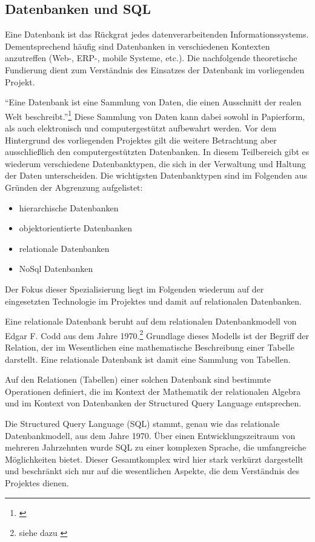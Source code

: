 \subsection{Datenbanken und SQL}
\label{sec:DatenbankenUndSql}

Eine Datenbank ist das Rückgrat jedes datenverarbeitenden Informationssystems. Dementsprechend häufig sind Datenbanken in 
verschiedenen Kontexten anzutreffen (Web-, ERP-, mobile Systeme, etc.). Die nachfolgende theoretische Fundierung dient zum 
Verständnis des Einsatzes der Datenbank im vorliegenden Projekt.

"`Eine Datenbank ist eine Sammlung von Daten, die einen Ausschnitt der realen Welt beschreibt."'\footnote{\citet[S.~18]{elmasri2009}}
Diese
Sammlung von Daten kann dabei sowohl in Papierform, als auch elektronisch und computergestützt aufbewahrt werden. Vor dem 
Hintergrund des vorliegenden Projektes gilt die weitere Betrachtung aber ausschließlich den computergestützten Datenbanken.
In diesem Teilbereich gibt es wiederum verschiedene Datenbanktypen, die sich in der Verwaltung und Haltung der Daten 
unterscheiden. Die wichtigsten Datenbanktypen sind im Folgenden aus Gründen der Abgrenzung aufgelistet:

\begin{itemize}
  \item hierarchische Datenbanken
  \item objektorientierte Datenbanken
  \item relationale Datenbanken
  \item NoSql Datenbanken
\end{itemize}

Der Fokus dieser Spezialisierung liegt im Folgenden wiederum auf der eingesetzten Technologie im Projektes und damit auf 
relationalen Datenbanken. 

Eine relationale Datenbank beruht auf dem relationalen Datenbankmodell von Edgar F. Codd aus dem Jahre 1970.\footnote{siehe dazu \citet{codd1970}} Grundlage dieses Modells ist der Begriff der Relation, der im Wesentlichen
eine mathematische Beschreibung einer Tabelle darstellt. Eine relationale Datenbank ist damit eine Sammlung von Tabellen.

Auf den Relationen (Tabellen) einer solchen Datenbank sind bestimmte Operationen definiert, die im Kontext der Mathematik 
der relationalen Algebra und im Kontext von Datenbanken der Structured Query Language entsprechen.

Die Structured Query Language (SQL) stammt, genau wie das relationale Datenbankmodell, aus dem Jahre 1970. Über einen Entwicklungszeitraum von mehreren Jahrzehnten 
wurde SQL zu einer komplexen Sprache, die umfangreiche Möglichkeiten bietet. Dieser Gesamtkomplex wird hier stark verkürzt
dargestellt und beschränkt sich nur auf die wesentlichen Aspekte, die dem Verständnis des Projektes dienen.


